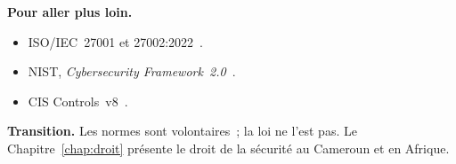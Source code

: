 \begin{boxinfo}
\textbf{Pour aller plus loin.}
\begin{itemize}
    \item ISO/IEC~27001 et 27002:2022~\cite{iso27001_2022,iso27002_2022}.
    \item NIST, \emph{Cybersecurity Framework~2.0}~\cite{nist2024csf}.
    \item CIS Controls~v8~\cite{cis2021controls}.
\end{itemize}
\end{boxinfo}

\begin{boxinfo}
\textbf{Transition.} Les normes sont volontaires~; la loi ne l'est pas.
Le Chapitre~\ref{chap:droit} présente le droit de la sécurité au Cameroun
et en Afrique.
\end{boxinfo}

